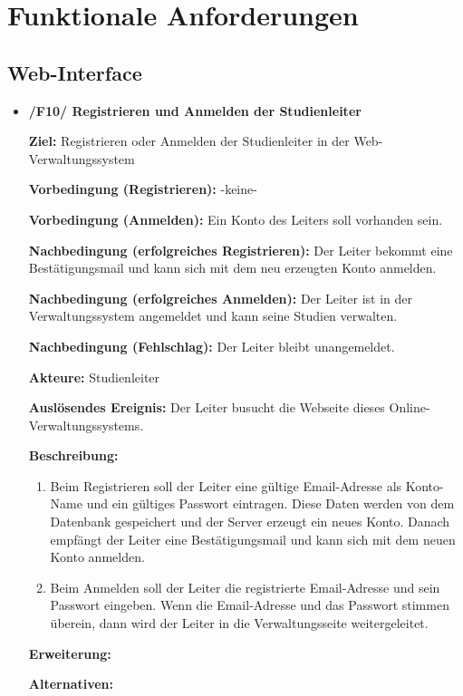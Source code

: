 \documentclass[a4paper]{scrreprt}
\begin{document}
    \chapter{Funktionale Anforderungen}

        \section{\gls{Web-Interface}}
            \begin{itemize}
                \item \textbf{/F10/ Registrieren und Anmelden der \gls{Studienleiter}}

                    \par \textbf{Ziel: }Registrieren oder Anmelden der \gls{Studienleiter} in der Web-Verwaltungssystem
                    \par \textbf{Vorbedingung (Registrieren): }-keine-
                    \par \textbf{Vorbedingung (Anmelden): }Ein Konto des Leiters soll vorhanden sein.
                    \par \textbf{Nachbedingung (erfolgreiches Registrieren): }Der Leiter bekommt eine Bestätigungsmail und kann sich mit dem neu erzeugten Konto anmelden.
                    \par \textbf{Nachbedingung (erfolgreiches Anmelden): }Der Leiter ist in der Verwaltungssystem angemeldet und kann seine Studien verwalten.
                    \par \textbf{Nachbedingung (Fehlschlag): }Der Leiter bleibt unangemeldet.
                    \par \textbf{Akteure: }\gls{Studienleiter}
                    \par \textbf{Auslösendes Ereignis: }Der Leiter busucht die Webseite dieses Online-Verwaltungssystems.
                    \par \textbf{Beschreibung: }
                        \begin{enumerate}
                            \item Beim Registrieren soll der Leiter eine gültige Email-Adresse als Konto-Name und ein gültiges Passwort eintragen. Diese Daten werden von dem Datenbank gespeichert und der Server erzeugt ein neues Konto. Danach empfängt der Leiter eine Bestätigungsmail und kann sich mit dem neuen Konto anmelden.
                            \item Beim Anmelden soll der Leiter die registrierte Email-Adresse und sein Passwort eingeben. Wenn die Email-Adresse und das Passwort stimmen überein, dann wird der Leiter in die Verwaltungsseite weitergeleitet.
                        \end{enumerate}
                    \par \textbf{Erweiterung: }
                    \par \textbf{Alternativen: }



\end{itemize}
\end{document}
